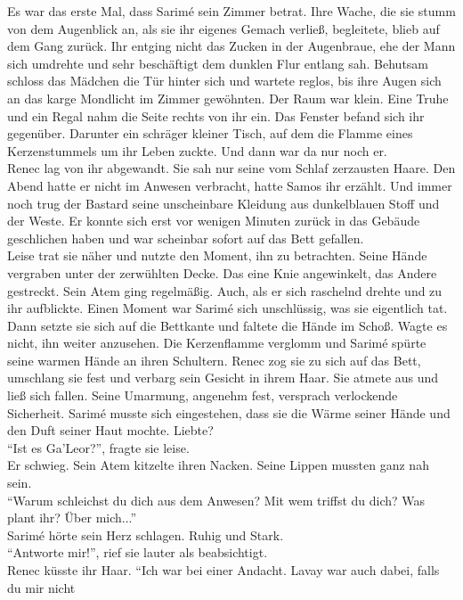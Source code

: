 Es war das erste Mal, dass Sarimé sein Zimmer betrat. Ihre Wache, die sie stumm von dem Augenblick 
an, als sie ihr eigenes Gemach verließ, begleitete, blieb auf dem Gang zurück. Ihr entging nicht 
das Zucken in der Augenbraue, ehe der Mann sich umdrehte und sehr beschäftigt dem dunklen Flur 
entlang sah. Behutsam schloss das Mädchen die Tür hinter sich und wartete reglos, bis ihre Augen 
sich an das karge Mondlicht im Zimmer gewöhnten. Der Raum war klein. Eine Truhe und ein Regal nahm 
die Seite rechts von ihr ein. Das Fenster befand sich ihr gegenüber. Darunter ein schräger kleiner 
Tisch, auf dem die Flamme eines Kerzenstummels um ihr Leben zuckte. Und dann war da nur noch er.\\
Renec lag von ihr abgewandt. Sie sah nur seine vom Schlaf zerzausten Haare. Den Abend hatte er 
nicht im Anwesen verbracht, hatte Samos ihr erzählt. Und immer noch trug der Bastard seine 
unscheinbare Kleidung aus dunkelblauen Stoff und der Weste. Er konnte sich erst vor wenigen 
Minuten zurück in das Gebäude geschlichen haben und war scheinbar sofort auf das Bett gefallen.\\
Leise trat sie näher und nutzte den Moment, ihn zu betrachten. Seine Hände vergraben unter der 
zerwühlten Decke. Das eine Knie angewinkelt, das Andere gestreckt. Sein Atem ging regelmäßig. Auch, 
als er sich raschelnd drehte und zu ihr aufblickte. Einen Moment war Sarimé sich unschlüssig, was 
sie eigentlich tat. Dann setzte sie sich auf die Bettkante und faltete die Hände im Schoß. Wagte es 
nicht, ihn weiter anzusehen. Die Kerzenflamme verglomm und Sarimé spürte seine warmen Hände an 
ihren Schultern. Renec zog sie zu sich auf das Bett, umschlang sie fest und verbarg sein Gesicht in 
ihrem Haar. Sie atmete aus und ließ sich fallen. Seine Umarmung, angenehm fest, versprach 
verlockende Sicherheit. Sarimé musste sich eingestehen, dass sie die Wärme seiner Hände und den 
Duft seiner Haut mochte. Liebte?\\
``Ist es Ga'Leor?'', fragte sie leise.\\
Er schwieg. Sein Atem kitzelte ihren Nacken. Seine Lippen mussten ganz nah sein.\\
``Warum schleichst du dich aus dem Anwesen? Mit wem triffst du dich? Was plant ihr? Über mich...''\\
Sarimé hörte sein Herz schlagen. Ruhig und Stark.\\
``Antworte mir!'', rief sie lauter als beabsichtigt.\\
Renec küsste ihr Haar. ``Ich war bei einer Andacht. Lavay war auch dabei, falls du mir nicht 
